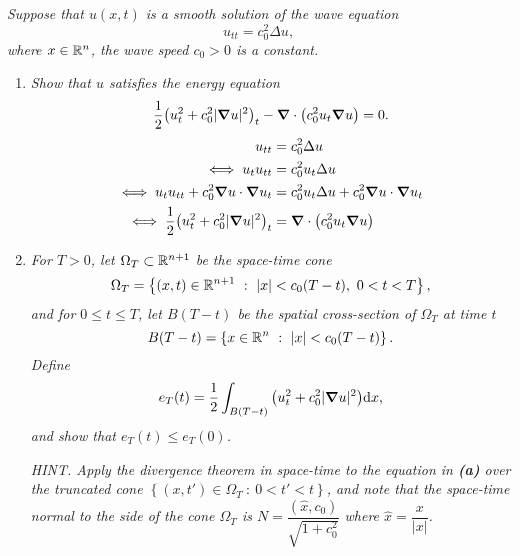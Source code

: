 \emph{Suppose that $u(x,t)$ is a smooth solution of the wave equation $$u_{tt} = c_0^2 \Delta u,$$ where $x \in \mathbb{R}^n$, the wave speed $c_0 > 0$ is a constant.}
\begin{enumerate}[\bf (a)]
    \item
        \emph{Show that $u$ satisfies the energy equation $$\frac{1}{2}\qty(u_t^2 + c_0^2|\grad u|^2)_t - \grad \cdot \qty(c_0^2 u_t\grad u) = 0.$$}
        \begin{align*}
            u_{tt} &= c_0^2 \Delta u \\
            \iff u_tu_{tt} &= c_0^2 u_t\Delta u \\
            \iff u_tu_{tt} + c_0^2 \grad u \cdot \grad u_t &= c_0^2u_t\Delta u + c_0^2 \grad u \cdot \grad u_t \\
            \iff \frac{1}{2}\qty(u_t^2 + c_0^2|\grad u|^2)_t &= \grad \cdot \qty(c_0^2 u_t \grad u)
        \end{align*}
    \item
        \emph{For $T > 0$, let $\Omega_T \subset \mathbb{R}^{n+1}$ be the space-time cone $$\Omega_T = \left\{(x,t) \in \mathbb{R}^{n+1}\ :\ |x| < c_0(T - t),\ 0 < t < T\right\},$$ and for $0 \leq t \leq T$, let $B(T - t)$ be the spatial cross-section of $\Omega_T$ at time $t$ $$B(T - t) = \left\{x \in \mathbb{R}^n\ :\ |x| < c_0(T - t)\right\}.$$  Define $$e_T(t) = \frac{1}{2}\int_{B(T - t)}\qty(u_t^2 + c_0^2|\grad u|^2)\dd x,$$ and show that $e_T(t) \leq e_T(0)$.}

        \emph{HINT.  Apply the divergence theorem in space-time to the equation in \textbf{(a)} over the truncated cone $\left\{(x, t') \in \Omega_T\ :\ 0 < t' < t\right\}$, and note that the space-time normal to the side of the cone $\Omega_T$ is $N = \dfrac{(\hat{x}, c_0)}{\sqrt{1 + c_0^2}}$ where $\hat{x} = \dfrac{x}{|x|}$.} \\


\end{enumerate}
